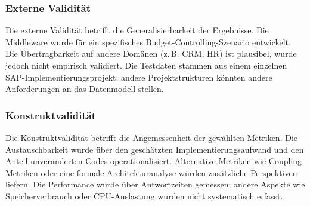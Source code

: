 \subsubsection{Externe Validität}

Die externe Validität betrifft die Generalisierbarkeit der Ergebnisse. Die Middleware wurde für ein spezifisches Budget-Controlling-Szenario entwickelt. Die Übertragbarkeit auf andere Domänen (z.\,B. CRM, HR) ist plausibel, wurde jedoch nicht empirisch validiert. Die Testdaten stammen aus einem einzelnen SAP-Implementierungsprojekt; andere Projektstrukturen könnten andere Anforderungen an das Datenmodell stellen.

\subsubsection{Konstruktvalidität}

Die Konstruktvalidität betrifft die Angemessenheit der gewählten Metriken. Die Austauschbarkeit wurde über den geschätzten Implementierungsaufwand und den Anteil unveränderten Codes operationalisiert. Alternative Metriken wie Coupling-Metriken oder eine formale Architekturanalyse würden zusätzliche Perspektiven liefern. Die Performance wurde über Antwortzeiten gemessen; andere Aspekte wie Speicherverbrauch oder CPU-Auslastung wurden nicht systematisch erfasst.
